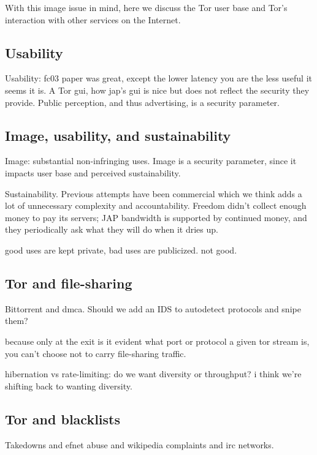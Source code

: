 \documentclass{llncs}
\begin{document}
With this image issue in mind, here we discuss the Tor user base and
Tor's interaction with other services on the Internet.



\subsection{Usability}

Usability: fc03 paper was great, except the lower latency you are the
less useful it seems it is.
A Tor gui, how jap's gui is nice but does not reflect the security
they provide.
Public perception, and thus advertising, is a security parameter.


\subsection{Image, usability, and sustainability}

Image: substantial non-infringing uses. Image is a security parameter,
since it impacts user base and perceived sustainability.

Sustainability. Previous attempts have been commercial which we think
adds a lot of unnecessary complexity and accountability. Freedom didn't
collect enough money to pay its servers; JAP bandwidth is supported by
continued money, and they periodically ask what they will do when it
dries up.

good uses are kept private, bad uses are publicized. not good.

\subsection{Tor and file-sharing}

Bittorrent and dmca. Should we add an IDS to autodetect protocols and
snipe them?

because only at the exit is it evident what port or protocol a given
tor stream is, you can't choose not to carry file-sharing traffic.

hibernation vs rate-limiting: do we want diversity or throughput? i
think we're shifting back to wanting diversity.

\subsection{Tor and blacklists}

Takedowns and efnet abuse and wikipedia complaints and irc
networks.
\end{document}
